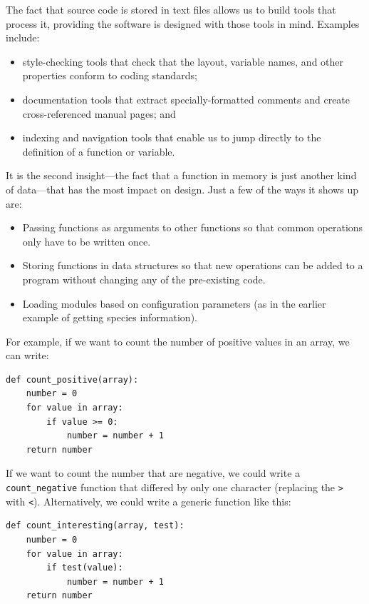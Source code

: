 \documentclass[10pt,letterpaper]{article}
\begin{document}
The fact that source code is stored in text files
allows us to build tools that process it,
providing the software is designed with those tools in mind.
Examples include:

\begin{itemize}
\item
  style-checking tools that check that the layout, variable names, and other properties
  conform to coding standards;
\item
  documentation tools that extract specially-formatted comments
  and create cross-referenced manual pages; and
\item
  indexing and navigation tools that enable us to jump directly to
  the definition of a function or variable.
\end{itemize}

It is the second insight---the fact that
a function in memory is just another kind of data---that has the most impact on design.
Just a few of the ways it shows up are:

\begin{itemize}
\item
  Passing functions as arguments to other functions
  so that common operations only have to be written once.
\item
  Storing functions in data structures
  so that new operations can be added to a program
  without changing any of the pre-existing code.
\item
  Loading modules based on configuration parameters
  (as in the earlier example of getting species information).
\end{itemize}

For example,
if we want to count the number of positive values in an array,
we can write:

\begin{lstlisting}
def count_positive(array):
    number = 0
    for value in array:
        if value >= 0:
            number = number + 1
    return number
\end{lstlisting}

If we want to count the number that are negative,
we could write a \texttt{count\_negative} function that differed by only one character
(replacing the \texttt{>} with \texttt{<}).
Alternatively,
we could write a generic function like this:

\begin{lstlisting}
def count_interesting(array, test):
    number = 0
    for value in array:
        if test(value):
            number = number + 1
    return number
\end{lstlisting}
\end{document}
